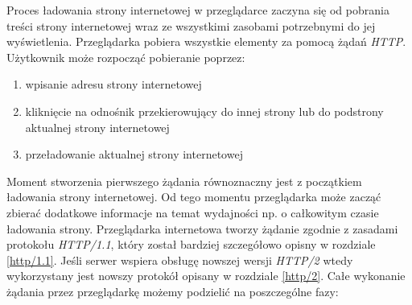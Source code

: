 \documentclass[polish, twoside, 12pt]{mwart}
\begin{document}
Proces ładowania strony internetowej w przeglądarce zaczyna się od pobrania treści strony internetowej wraz ze wszystkimi zasobami potrzebnymi do jej wyświetlenia.
Przeglądarka pobiera wszystkie elementy za pomocą żądań \emph{HTTP}. Użytkownik może rozpocząć pobieranie poprzez:

\begin{enumerate}
  \item wpisanie adresu strony internetowej
  \item kliknięcie na odnośnik przekierowujący do innej strony lub do podstrony aktualnej strony internetowej
  \item przeładowanie aktualnej strony internetowej
\end{enumerate}

Moment stworzenia pierwszego żądania równoznaczny jest z początkiem ładowania strony internetowej. Od tego momentu przeglądarka może zacząć zbierać dodatkowe informacje na temat wydajności np. o całkowitym czasie ładowania strony. Przeglądarka internetowa tworzy żądanie zgodnie z zasadami protokołu \emph{HTTP/1.1}, który został bardziej szczegółowo opisny w rozdziale \ref{http/1.1}. Jeśli serwer wspiera obsługę nowszej wersji \emph{HTTP/2} wtedy wykorzystany jest nowszy protokół opisany w rozdziale \ref{http/2}. Całe wykonanie żądania przez przeglądarkę możemy podzielić na poszczególne fazy:
\end{document}
